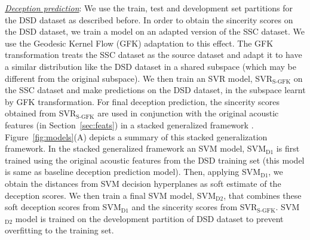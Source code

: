 \documentclass{article}
\begin{document}
\noindent\underline{\it Deception prediction}: 
We use the train, test and development set partitions for the DSD dataset as described before.
In order to obtain the sincerity scores on the DSD dataset, we train a model on an adapted version of the SSC dataset.
We use the Geodesic Kernel Flow (GFK) adaptation \cite{gong2012geodesic} to this effect.
The GFK transformation treats the SSC dataset as the source dataset and adapt it to have a similar distribution like the DSD dataset in a shared subspace (which may be different from the original subspace). 
We then train an SVR model, SVR$_\text{S-GFK}$ on the SSC dataset and make predictions on the DSD dataset, in the subspace learnt by GFK transformation.
For final deception prediction, the sincerity scores obtained from SVR$_\text{S-GFK}$ are used in conjunction with the original acoustic features (in Section~\ref{sec:feats}) in a stacked generalized framework \cite{wolpert1992stacked}.
Figure~\ref{fig:models}(A) depicts a summary of this stacked generalization framework.
In the stacked generalized framework an SVM model, SVM$_\text{D1}$ is first trained using the original acoustic features from the DSD training set (this model is same as baseline deception prediction model).
Then, applying SVM$_\text{D1}$, we obtain the distances from SVM decision hyperplanes as soft estimate of the deception scores. 
We then train a final SVM model, SVM$_\text{D2}$, that combines these soft deception scores from SVM$_\text{D1}$ and the sincerity scores from SVR$_\text{S-GFK}$.
SVM$_\text{D2}$ model is trained on the development partition of DSD dataset to prevent overfitting to the training set. 
\\


\end{document}
